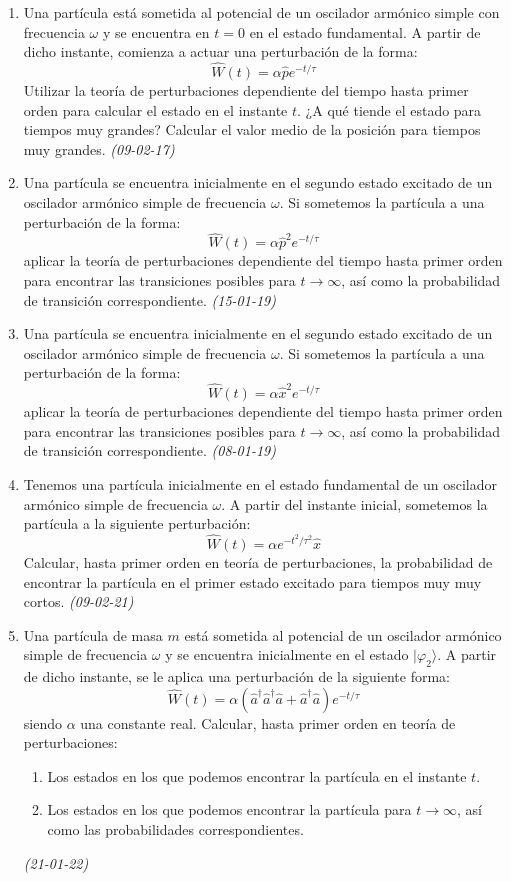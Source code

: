 \begin{enumerate}
    \item Una partícula está sometida al potencial de un oscilador armónico simple con frecuencia \( \omega \) y se encuentra en \( t = 0 \) en el estado fundamental. A partir de dicho instante, comienza a actuar una perturbación de la forma:
    \[
    \hat{W}(t) = \alpha \hat{p} e^{-t/\tau}
    \]
    Utilizar la teoría de perturbaciones dependiente del tiempo hasta primer orden para calcular el estado en el instante \( t \). ¿A qué tiende el estado para tiempos muy grandes? Calcular el valor medio de la posición para tiempos muy grandes. \textit{(09-02-17)}


    \item Una partícula se encuentra inicialmente en el segundo estado excitado de un oscilador armónico simple de frecuencia \(\omega\). Si sometemos la partícula a una perturbación de la forma:
    \[
    \hat{W}(t) = \alpha \hat{p}^2 e^{-t/\tau}
    \]
    aplicar la teoría de perturbaciones dependiente del tiempo hasta primer orden para encontrar las transiciones posibles para \(t \to \infty\), así como la probabilidad de transición correspondiente. \textit{(15-01-19)}

    \item Una partícula se encuentra inicialmente en el segundo estado excitado de un oscilador armónico simple de frecuencia \(\omega\). Si sometemos la partícula a una perturbación de la forma:
    \[
    \hat{W}(t) = \alpha \hat{x}^2 e^{-t/\tau}
    \]
    aplicar la teoría de perturbaciones dependiente del tiempo hasta primer orden para encontrar las transiciones posibles para \(t \to \infty\), así como la probabilidad de transición correspondiente. \textit{(08-01-19)}

    \item Tenemos una partícula inicialmente en el estado fundamental de un oscilador armónico simple de frecuencia \(\omega\). A partir del instante inicial, sometemos la partícula a la siguiente perturbación:
    \[
    \hat{W}(t) = \alpha e^{-t^2/\tau^2} \hat{x}
    \]
    Calcular, hasta primer orden en teoría de perturbaciones, la probabilidad de encontrar la partícula en el primer estado excitado para tiempos muy muy cortos. \textit{(09-02-21)}

    \item Una partícula de masa \(m\) está sometida al potencial de un oscilador armónico simple de frecuencia \(\omega\) y se encuentra inicialmente en el estado \(|\varphi_2\rangle\). A partir de dicho instante, se le aplica una perturbación de la siguiente forma:
    \[
    \hat{W}(t) = \alpha \left( \hat{a}^\dagger \hat{a}^\dagger \hat{a} + \hat{a}^\dagger \hat{a} \right) e^{-t/\tau}
    \]
    siendo \(\alpha\) una constante real. Calcular, hasta primer orden en teoría de perturbaciones:
    \begin{enumerate}
        \item Los estados en los que podemos encontrar la partícula en el instante \(t\).
        \item Los estados en los que podemos encontrar la partícula para \(t \to \infty\), así como las probabilidades correspondientes.
    \end{enumerate} \textit{(21-01-22)}


\end{enumerate}
